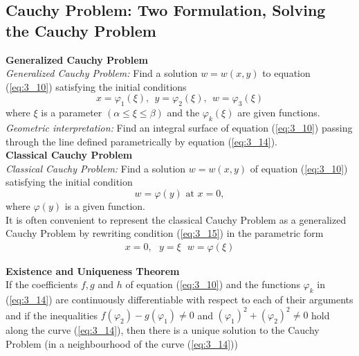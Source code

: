 \documentclass[11pt]{report}
\newcommand{\NI}{\noindent}
\newcommand{\sps}{\\[0.2cm]}
\newcommand{\refn}[1]{(\ref{#1})}
\newcommand{\refx}[1]{\refn{eq:#1}}
\newcommand{\bt}[1]{\textbf{#1}}
\begin{document}
	\subsection{Cauchy Problem: Two Formulation, Solving the Cauchy Problem}
	\bt{Generalized Cauchy Problem}\sps
	\textit{Generalized Cauchy Problem:} Find a solution $w=w(x,y)$ to equation \refx{3_10} satisfying the initial conditions
	\begin{equation}
		x=\varphi_1(\xi), ~~ y=\varphi_2(\xi), ~~ w=\varphi_3(\xi)\label{eq:3_14}
	\end{equation}
	where $\xi$ is a parameter $(\alpha \leq \xi \leq \beta)$ and the $\varphi_k(\xi)$ are given functions.\\
	
	\textit{Geometric interpretation:} Find an integral surface of equation \refx{3_10} passing through the line defined parametrically by equation \refx{3_14}.\\
	
	\NI\bt{Classical Cauchy Problem}\sps
	\textit{Classical Cauchy Problem:} Find a solution $w=w(x,y)$ of equation \refx{3_10} satisfying the initial condition
	\begin{equation}
		w=\varphi(y) \text{ at } x=0, \label{eq:3_15}
	\end{equation}
	where $\varphi(y)$ is a given function.\\
	It is often convenient to represent the classical Cauchy Problem as a generalized Cauchy Problem by rewriting condition \refx{3_15} in the parametric form
	\begin{eqnarray*}
		x=0, ~~~ y=\xi~~~ w=\varphi(\xi)
	\end{eqnarray*}
	
	\NI\bt{Existence and Uniqueness Theorem}\sps
	If the coefficients $f,g$ and $h$ of equation \refx{3_10}  and the functions $\varphi_k$ in \refx{3_14} are continuously differentiable with respect to each of their arguments and if the inequalities $f(\varphi_2) - g(\varphi_1) \neq 0$ and $(\varphi_1)^2 + (\varphi_2)^2 \neq 0$ hold along the curve \refx{3_14}, then there is a unique solution to the Cauchy Problem (in a neighbourhood of the curve \refx{3_14})
	
\end{document}
